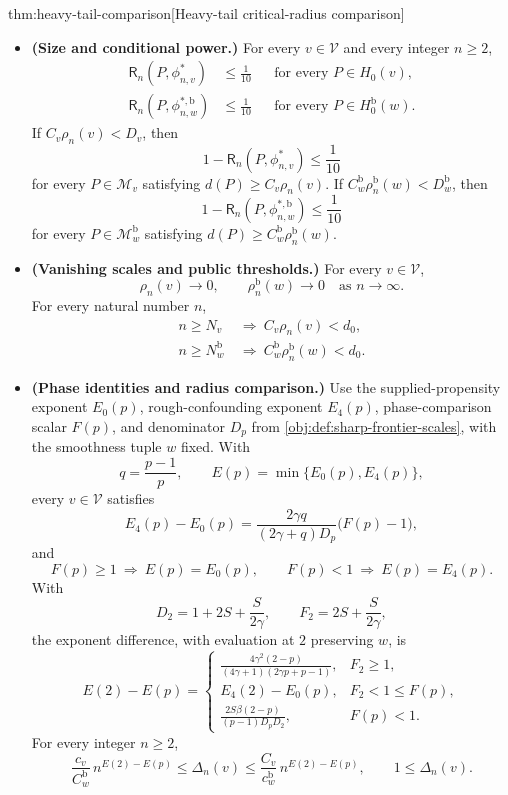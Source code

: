\documentclass[11pt]{article}
\begin{document}
\begin{theoremv}{thm:heavy-tail-comparison}[Heavy-tail critical-radius comparison]
\begin{itemize}
\item \textbf{(Size and conditional power.)}
For every \(v\in\mathcal V\) and every integer \(n\ge2\),
\[
\begin{aligned}
\mathsf R_n(P,\phi^*_{n,v})&\le\frac1{10}
&&\text{for every }P\in H_0(v),\\
\mathsf R_n(P,\phi^{*,\mathrm b}_{n,w})&\le\frac1{10}
&&\text{for every }P\in H_0^{\mathrm b}(w).
\end{aligned}
\]
If \(C_v\rho_n(v)<D_v\), then
\[
1-\mathsf R_n(P,\phi^*_{n,v})\le\frac1{10}
\]
for every \(P\in\mathcal M_v\) satisfying \(d(P)\ge C_v\rho_n(v)\).
If \(C_w^{\mathrm b}\rho_n^{\mathrm b}(w)<D_w^{\mathrm b}\), then
\[
1-\mathsf R_n(P,\phi^{*,\mathrm b}_{n,w})\le\frac1{10}
\]
for every \(P\in\mathcal M^{\mathrm b}_w\) satisfying
\(d(P)\ge C_w^{\mathrm b}\rho_n^{\mathrm b}(w)\).

\item \textbf{(Vanishing scales and public thresholds.)}
For every \(v\in\mathcal V\),
\[
\rho_n(v)\longrightarrow0,
\qquad
\rho_n^{\mathrm b}(w)\longrightarrow0
\quad\text{as }n\longrightarrow\infty.
\]
For every natural number \(n\),
\[
\begin{aligned}
n\ge N_v
&\ \Longrightarrow\ C_v\rho_n(v)<d_0,\\
n\ge N_w^{\mathrm b}
&\ \Longrightarrow\ C_w^{\mathrm b}\rho_n^{\mathrm b}(w)<d_0.
\end{aligned}
\]

\item \textbf{(Phase identities and radius comparison.)}
Use the supplied-propensity exponent \(E_0(p)\), rough-confounding exponent \(E_4(p)\), phase-comparison scalar \(F(p)\), and denominator \(D_p\) from \cref{obj:def:sharp-frontier-scales}, with the smoothness tuple \(w\) fixed. With
\[
q=\frac{p-1}{p},
\qquad
E(p)=\min\{E_0(p),E_4(p)\},
\]
every \(v\in\mathcal V\) satisfies
\[
E_4(p)-E_0(p)
=
\frac{2\gamma q}{(2\gamma+q)D_p}\bigl(F(p)-1\bigr),
\]
and
\[
F(p)\ge1\ \Longrightarrow\ E(p)=E_0(p),
\qquad
F(p)<1\ \Longrightarrow\ E(p)=E_4(p).
\]
With
\[
D_2=1+2S+\frac{S}{2\gamma},
\qquad
F_2=2S+\frac{S}{2\gamma},
\]
the exponent difference, with evaluation at \(2\) preserving \(w\), is
\[
E(2)-E(p)=
\begin{cases}
\displaystyle
\frac{4\gamma^2(2-p)}{(4\gamma+1)(2\gamma p+p-1)},
&F_2\ge1,\\[6pt]
\displaystyle E_4(2)-E_0(p),
&F_2<1\le F(p),\\[4pt]
\displaystyle
\frac{2S\beta(2-p)}{(p-1)D_pD_2},
&F(p)<1.
\end{cases}
\]
For every integer \(n\ge2\),
\[
\frac{c_v}{C_w^{\mathrm b}}\,n^{E(2)-E(p)}
\le\Delta_n(v)
\le
\frac{C_v}{c_w^{\mathrm b}}\,n^{E(2)-E(p)},
\qquad
1\le\Delta_n(v).
\]


\end{itemize}
\end{theoremv}
\end{document}
